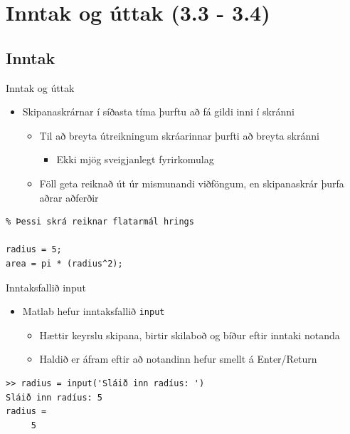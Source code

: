 \documentclass[handout]{beamer}
\begin{document}
\section{Inntak og úttak (3.3 - 3.4)}

\subsection{Inntak}

\begin{frame}[fragile]{Inntak og úttak}
\begin{itemize}
 \item Skipanaskrárnar í síðasta tíma þurftu að fá gildi inni í skránni
 \begin{itemize}
  \item Til að breyta útreikningum skráarinnar þurfti að breyta skránni
  \begin{itemize}
   \item Ekki mjög sveigjanlegt fyrirkomulag
  \end{itemize}
  \item Föll geta reiknað út úr mismunandi viðföngum, en skipanaskrár þurfa aðrar aðferðir
 \end{itemize}
\end{itemize}
\begin{verbatim}
% Þessi skrá reiknar flatarmál hrings

radius = 5;
area = pi * (radius^2);
\end{verbatim}
\end{frame}

\begin{frame}[fragile]{Inntaksfallið input}
\begin{itemize}
 \item Matlab hefur inntaksfallið \texttt{input}
 \begin{itemize}
  \item Hættir keyrslu skipana, birtir skilaboð og bíður eftir inntaki notanda
  \item Haldið er áfram eftir að notandinn hefur smellt á Enter/Return
 \end{itemize}
\end{itemize}

\begin{verbatim}
>> radius = input('Sláið inn radíus: ')
Sláið inn radíus: 5
radius =
     5
\end{verbatim}
\end{frame}
\end{document}
